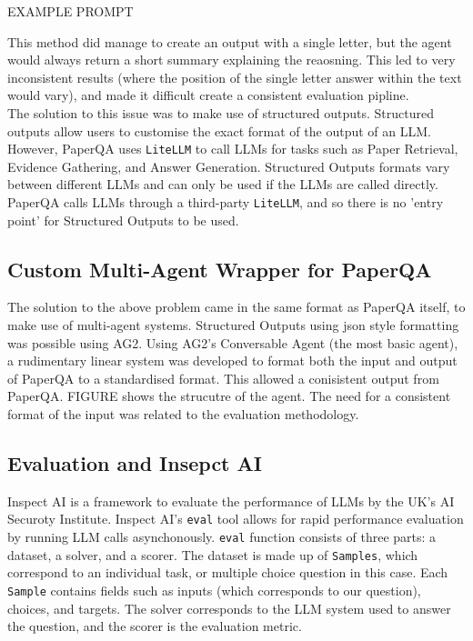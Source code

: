 EXAMPLE PROMPT

This method did manage to create an output with a single letter, but the agent would always return a short summary explaining the reaosning. 
This led to very inconsistent results (where the position of the single letter answer within the text would vary), and made it difficult create a consistent evaluation pipline. \\

The solution to this issue was to make use of structured outputs. Structured outputs allow users to customise the exact format of the output of an LLM. However, PaperQA uses \texttt{LiteLLM} to call LLMs for tasks such as Paper Retrieval, Evidence Gathering, and Answer Generation. Structured Outputs formats vary between different LLMs and can only be used if the LLMs are called directly. PaperQA calls LLMs through a third-party \texttt{LiteLLM}, and so there is no 'entry point' for Structured Outputs to be used.

\subsection{Custom Multi-Agent Wrapper for PaperQA}
The solution to the above problem came in the same format as PaperQA itself, to make use of multi-agent systems. Structured Outputs using json style formatting was possible using AG2. 
Using AG2's Conversable Agent (the most basic agent), a rudimentary linear system was developed to format both the input and output of PaperQA to a standardised format. 
This allowed a conisistent output from PaperQA. 
FIGURE shows the strucutre of the agent. 
The need for a consistent format of the input was related to the evaluation methodology. 

\subsection{Evaluation and Insepct AI}

Inspect AI is a framework to evaluate the performance of LLMs by the UK's AI Securoty Institute. Inspect AI's \texttt{eval} tool allows for rapid performance evaluation by running LLM calls asynchonously. \texttt{eval} function consists of three parts: a dataset, a solver, and a scorer. The dataset is made up of \texttt{Samples}, which correspond to an individual task, or multiple choice question in this case. Each \texttt{Sample} contains fields such as inputs (which corresponds to our question), choices, and targets. The solver corresponds to the LLM system used to answer the question, and the scorer is the evaluation metric. \\

